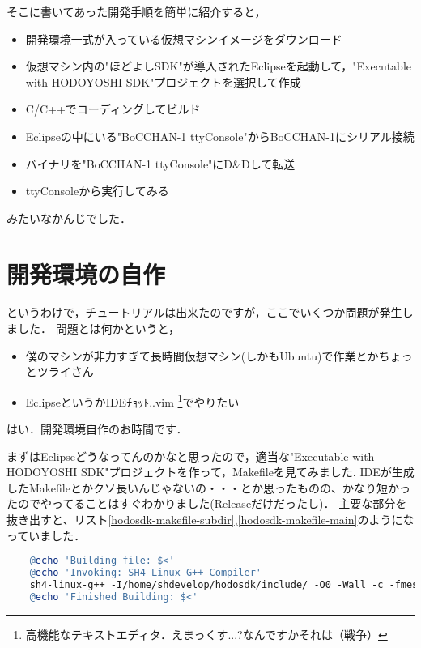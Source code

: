 そこに書いてあった開発手順を簡単に紹介すると，

\begin{itemize}
	\item 開発環境一式が入っている仮想マシンイメージをダウンロード
	\item 仮想マシン内の"ほどよしSDK"が導入されたEclipseを起動して，"Executable with HODOYOSHI SDK"プロジェクトを選択して作成
	\item C/C++でコーディングしてビルド
	\item Eclipseの中にいる"BoCCHAN-1 ttyConsole"からBoCCHAN-1にシリアル接続
	\item バイナリを"BoCCHAN-1 ttyConsole"にD\&Dして転送
	\item ttyConsoleから実行してみる
\end{itemize}

みたいなかんじでした．

\section{開発環境の自作}
というわけで，チュートリアルは出来たのですが，ここでいくつか問題が発生しました．
問題とは何かというと，

\begin{itemize}
	\item 僕のマシンが非力すぎて長時間仮想マシン(しかもUbuntu)で作業とかちょっとツライさん
	\item EclipseというかIDEﾁｮｯﾄ..vim \footnote{高機能なテキストエディタ．えまっくす...?なんですかそれは（戦争）}でやりたい
\end{itemize}

はい．開発環境自作のお時間です．

まずはEclipseどうなってんのかなと思ったので，適当な"Executable with HODOYOSHI SDK"プロジェクトを作って，Makefileを見てみました.
IDEが生成したMakefileとかクソ長いんじゃないの・・・とか思ったものの、かなり短かったのでやってることはすぐわかりました(Releaseだけだったし)．
主要な部分を抜き出すと、リスト\ref{hodosdk-makefile-subdir},\ref{hodosdk-makefile-main}のようになっていました．

\begin{lstlisting}[language=make,label=hodosdk-makefile-subdir,caption=subdir.mk(コンパイル部分)]
%o:../%.cpp
    @echo 'Building file: $<'
    @echo 'Invoking: SH4-Linux G++ Compiler'
    sh4-linux-g++ -I/home/shdevelop/hodosdk/include/ -O0 -Wall -c -fmessage-length=0 -MMD -MP -MF"$(@:%.o=%.d)" -MT"$(@:%.o=%.d)" -o "$@" "$<"
    @echo 'Finished Building: $<'
\end{lstlisting}

